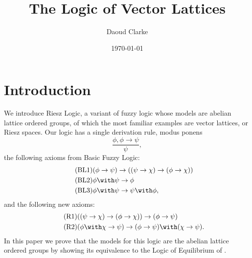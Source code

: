 \documentclass[preprint,leqno]{elsarticle}
\author{Daoud Clarke}
\date{\today}
\title{The Logic of Vector Lattices}
\begin{document}
\maketitle


\section{Introduction}

We introduce Riesz Logic, a variant of fuzzy logic whose models are
abelian lattice ordered groups, of which the most familiar examples
are vector lattices, or Riesz spaces.
%
%
%
%
%
Our logic has a single derivation rule, modus ponens
\begin{equation}\tag{MP}
\frac{\phi, \phi \rightarrow \psi}{\psi},
\end{equation}
the following axioms from Basic Fuzzy Logic:
\begin{align}
  \tag{BL1} &(\phi \rightarrow \psi) \rightarrow ((\psi \rightarrow \chi)
  \rightarrow (\phi \rightarrow \chi))\\
  \tag{BL2} &\phi \with \psi \rightarrow \phi\\
  \tag{BL3} &\phi \with \psi \rightarrow \psi \with \phi,
\end{align}
and the following new axioms:
\begin{align}
  \tag{R1} &((\psi \rightarrow \chi) \rightarrow (\phi \rightarrow
  \chi)) \rightarrow (\phi \rightarrow \psi)\\
  \tag{R2} &(\phi \with \chi \rightarrow \psi) \rightarrow (\phi \rightarrow \psi) \with (\chi \rightarrow \psi).
\end{align}
In this paper we prove that the models for this logic are the abelian
lattice ordered groups by showing its equivalence to the Logic of
Equilibrium of \cite{Galli:04}.

\end{document}

